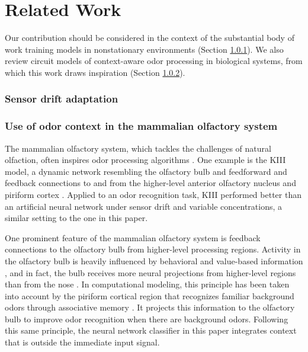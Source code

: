 \documentclass[onecolumn,pre,floats,aps,amsmath,amssymb,superscriptaddress]{revtex4-1}
\begin{document}
\section{Related Work}
Our contribution should be considered in the context of the substantial body of work training models in nonstationary environments (Section \ref{section:review-sensor-drift}). We also review circuit models of context-aware odor processing in biological systems, from which this work draws inspiration (Section \ref{section:review-biological-olfaction}).

\subsubsection{Sensor drift adaptation}
\label{section:review-sensor-drift}


\subsubsection{Use of odor context in the mammalian olfactory system}
\label{section:review-biological-olfaction}
The mammalian olfactory system, which tackles the challenges of natural olfaction, often inspires odor processing algorithms \cite{marco_recent_2009}. One example is the KIII model, a dynamic network resembling the olfactory bulb and feedforward and feedback connections to and from the higher-level anterior olfactory nucleus and piriform cortex \cite{fu_pattern_2007}. Applied to an odor recognition task, KIII performed better than an artificial neural network under sensor drift and variable concentrations, a similar setting to the one in this paper.

One prominent feature of the mammalian olfactory system is feedback connections to the olfactory bulb from higher-level processing regions. Activity in the olfactory bulb is heavily influenced by behavioral and value-based information \cite{kay_odor-_1999}, and in fact, the bulb receives more neural projections from higher-level regions than from the nose \cite{shipley_functional_1996}. In computational modeling, this principle has been taken into account by the piriform cortical region that recognizes familiar background odors through associative memory \cite{adams_top-down_2019}. It projects this information to the olfactory bulb to improve odor recognition when there are background odors. Following this same principle, the neural network classifier in this paper integrates context that is outside the immediate input signal.
\end{document}
